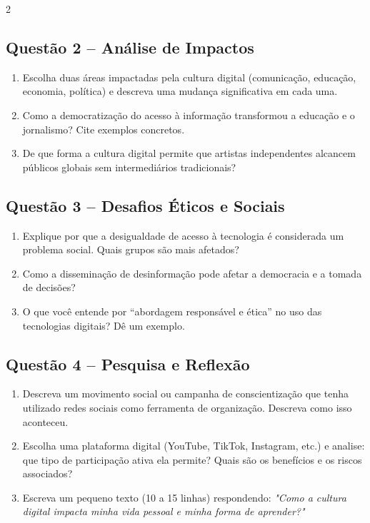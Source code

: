 \documentclass[12pt]{article}
\begin{document}
\begin{multicols}{2}
\subsection*{Questão 2 – Análise de Impactos}
\begin{enumerate}[label=\alph*)]
    \item Escolha duas áreas impactadas pela cultura digital (comunicação, educação, economia, política) e descreva uma mudança significativa em cada uma.
    \item Como a democratização do acesso à informação transformou a educação e o jornalismo? Cite exemplos concretos.
    \item De que forma a cultura digital permite que artistas independentes alcancem públicos globais sem intermediários tradicionais?
\end{enumerate}

\subsection*{Questão 3 – Desafios Éticos e Sociais}
\begin{enumerate}[label=\alph*)]
    \item Explique por que a desigualdade de acesso à tecnologia é considerada um problema social. Quais grupos são mais afetados?
    \item Como a disseminação de desinformação pode afetar a democracia e a tomada de decisões?
    \item O que você entende por “abordagem responsável e ética” no uso das tecnologias digitais? Dê um exemplo.
\end{enumerate}

\subsection*{Questão 4 – Pesquisa e Reflexão}
\begin{enumerate}[label=\alph*)]
    \item Descreva um movimento social ou campanha de conscientização que tenha utilizado redes sociais como ferramenta de organização. Descreva como isso aconteceu.
    \item Escolha uma plataforma digital (YouTube, TikTok, Instagram, etc.) e analise: que tipo de participação ativa ela permite? Quais são os benefícios e os riscos associados?
    \item Escreva um pequeno texto (10 a 15 linhas) respondendo: \textit{"Como a cultura digital impacta minha vida pessoal e minha forma de aprender?"}
\end{enumerate}

\end{multicols}
\end{document}
